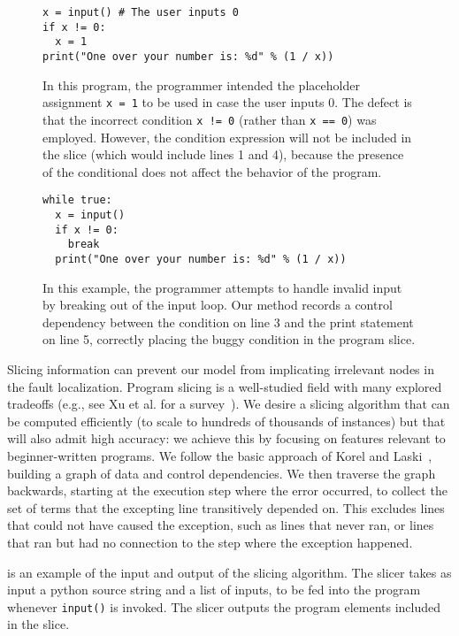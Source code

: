 \documentclass[conference]{IEEEtran}
\newcommand\lt[1]{{\lstinline|#1|}}
\begin{document}
\begin{figure}
\begin{lstlisting}
x = input() # The user inputs 0
if x != 0:
  x = 1
print("One over your number is: %d" % (1 / x))
\end{lstlisting}
\caption{In this program, the programmer intended the placeholder
  assignment \lt{x = 1} to be used in case the user inputs 0.
  The defect is that the
  incorrect condition \lt{x != 0} (rather than \lt{x == 0}) was employed. However, the
  condition expression will not be included in the slice (which would include
  lines 1 and 4), because the presence of
  the conditional does not affect the behavior of the program.
}
\label{fig-slice-downside-example}
\end{figure}

\begin{figure}
\begin{lstlisting}
while true:
  x = input()
  if x != 0:
    break
  print("One over your number is: %d" % (1 / x))
\end{lstlisting}
\caption{
  In this example, the programmer attempts to handle invalid input by
  breaking out of the input loop. Our method
  records a control dependency between the condition on line 3 and the
  print statement on line 5, correctly placing the buggy condition in the
  program slice.
}
\label{fig-early-break}
\end{figure}

Slicing information can prevent our model from implicating irrelevant
nodes in the fault localization. Program slicing is a well-studied
field with many explored tradeoffs (e.g., see Xu et al. for a
survey~\cite{xu2005}). We desire a slicing algorithm that can be computed
efficiently (to scale to hundreds of thousands of instances) but that will
also admit high accuracy: we achieve this by focusing on features relevant
to beginner-written programs. We
follow the basic approach of Korel and Laski~\cite{KOREL1988155,
KOREL1990187}, building a
graph of data and control dependencies. We then traverse the graph
backwards, starting at the execution step where the error occurred, to
collect the set of terms that the excepting line transitively depended on.
This excludes lines that could not have caused the exception, such as lines
that never ran, or lines that ran but had no connection to the step where
the exception happened.

 is an example of the input and output of the slicing
algorithm. The slicer takes as input a python source string and a list of inputs,
to be fed into the program whenever \lt{input()} is invoked. The slicer outputs
the program elements included in the slice.
\end{document}
